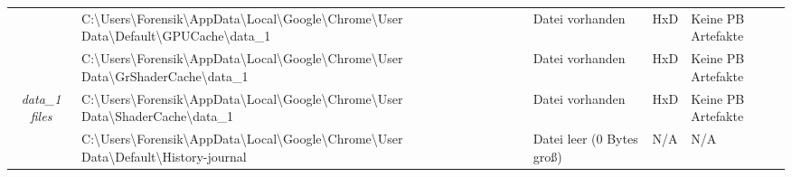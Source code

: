 \begin{appendices}
{\begin{landscape}
\begin{table}[h!]
{\begin{tabular}{cllll}
		\multicolumn{1}{|c|}{}                                                        & \multicolumn{1}{l|}{\cellcolor[HTML]{34CDF9}C:\textbackslash{}Users\textbackslash{}Forensik\textbackslash{}AppData\textbackslash{}Local\textbackslash{}Google\textbackslash{}Chrome\textbackslash{}User   Data\textbackslash{}Default\textbackslash{}GPUCache\textbackslash{}data\_1}                                                                                           & \multicolumn{1}{l|}{\cellcolor[HTML]{009901}Datei vorhanden}                                      & \multicolumn{1}{l|}{HxD}                                   & \multicolumn{1}{l|}{\cellcolor[HTML]{F8A102}Keine PB Artefakte} \\ \cline{2-5} 
		\multicolumn{1}{|c|}{}                                                        & \multicolumn{1}{l|}{\cellcolor[HTML]{34CDF9}C:\textbackslash{}Users\textbackslash{}Forensik\textbackslash{}AppData\textbackslash{}Local\textbackslash{}Google\textbackslash{}Chrome\textbackslash{}User   Data\textbackslash{}GrShaderCache\textbackslash{}data\_1}                                                                                                             & \multicolumn{1}{l|}{\cellcolor[HTML]{009901}Datei vorhanden}                                      & \multicolumn{1}{l|}{HxD}                                   & \multicolumn{1}{l|}{\cellcolor[HTML]{F8A102}Keine PB Artefakte} \\ \cline{2-5} 
		\multicolumn{1}{|c|}{\multirow{-5}{*}{\textit{data\_1 files}}}                & \multicolumn{1}{l|}{\cellcolor[HTML]{34CDF9}C:\textbackslash{}Users\textbackslash{}Forensik\textbackslash{}AppData\textbackslash{}Local\textbackslash{}Google\textbackslash{}Chrome\textbackslash{}User   Data\textbackslash{}ShaderCache\textbackslash{}data\_1}                                                                                                               & \multicolumn{1}{l|}{\cellcolor[HTML]{009901}Datei vorhanden}                                      & \multicolumn{1}{l|}{HxD}                                   & \multicolumn{1}{l|}{\cellcolor[HTML]{F8A102}Keine PB Artefakte} \\ \hline
		\multicolumn{1}{|c|}{}                                                        & \multicolumn{1}{l|}{\cellcolor[HTML]{34CDF9}C:\textbackslash{}Users\textbackslash{}Forensik\textbackslash{}AppData\textbackslash{}Local\textbackslash{}Google\textbackslash{}Chrome\textbackslash{}User   Data\textbackslash{}Default\textbackslash{}History-journal}                                                                                                           & \multicolumn{1}{l|}{\cellcolor[HTML]{AB70E9}Datei leer (0 Bytes groß)}                            & \multicolumn{1}{l|}{\cellcolor[HTML]{C0C0C0}N/A}           & \multicolumn{1}{l|}{\cellcolor[HTML]{C0C0C0}N/A}                \\ \cline{2-5} 

\end{tabular}}
\end{table}
\end{landscape}}
\end{appendices}
